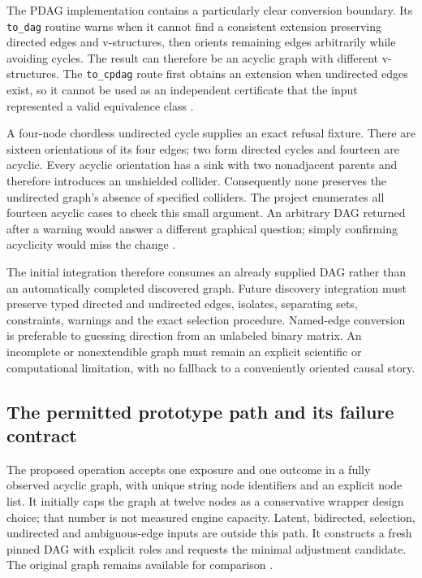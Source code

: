 The PDAG implementation contains a particularly clear conversion boundary.
Its \texttt{to\_dag} routine warns when it cannot find a consistent
extension preserving directed edges and v-structures, then orients remaining
edges arbitrarily while avoiding cycles. The result can therefore be an
acyclic graph with different v-structures. The \texttt{to\_cpdag} route
first obtains an extension when undirected edges exist, so it cannot be
used as an independent certificate that the input represented a valid
equivalence class \cite{exec13_pgmpy_reuse_primary}.

A four-node chordless undirected cycle supplies an exact refusal fixture.
There are sixteen orientations of its four edges; two form directed cycles
and fourteen are acyclic. Every acyclic orientation has a sink with two
nonadjacent parents and therefore introduces an unshielded collider.
Consequently none preserves the undirected graph's absence of specified
colliders. The project enumerates all fourteen acyclic cases to check this
small argument. An arbitrary DAG returned after a warning would answer a
different graphical question; simply confirming acyclicity would miss the
change \cite{exec13_pgmpy_reuse_oracle}.

The initial integration therefore consumes an already supplied DAG rather
than an automatically completed discovered graph. Future discovery
integration must preserve typed directed and undirected edges, isolates,
separating sets, constraints, warnings and the exact selection procedure.
Named-edge conversion is preferable to guessing direction from an unlabeled
binary matrix. An incomplete or nonextendible graph must remain an explicit
scientific or computational limitation, with no fallback to a conveniently
oriented causal story.

\subsection{The permitted prototype path and its failure contract}

The proposed operation accepts one exposure and one outcome in a fully
observed acyclic graph, with unique string node identifiers and an explicit
node list. It initially caps the graph at twelve nodes as a conservative
wrapper design choice; that number is not measured engine capacity.
Latent, bidirected, selection, undirected and ambiguous-edge inputs are
outside this path. It constructs a fresh pinned DAG with explicit roles
and requests the minimal adjustment candidate. The original graph remains
available for comparison \cite{exec13_pgmpy_reuse_oracle}.

